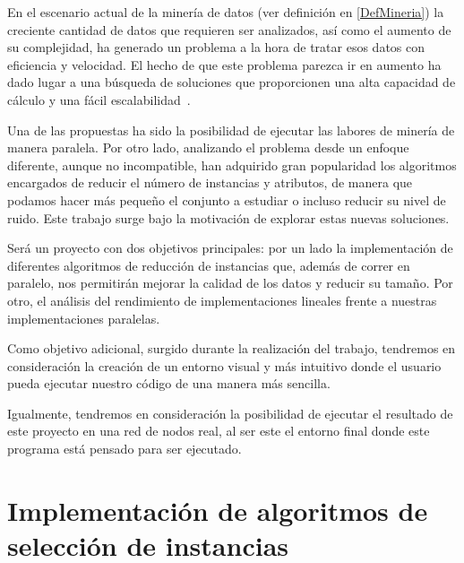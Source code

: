 

En el escenario actual de la minería de datos (ver definición en \ref{DefMineria}) la creciente cantidad de datos que requieren ser analizados, así como el aumento de su complejidad,  ha generado un problema a la hora de tratar esos datos con eficiencia y velocidad. El hecho de que este problema parezca ir en aumento ha dado lugar a una búsqueda de soluciones que proporcionen una alta capacidad de cálculo y una fácil escalabilidad~\cite{DataMiningConcepts}. 

Una de las propuestas ha sido la posibilidad de ejecutar las labores de minería de manera paralela. Por otro lado, analizando el problema desde un enfoque diferente, aunque no incompatible, han adquirido gran popularidad los algoritmos encargados de reducir el número de instancias y atributos, de manera que podamos hacer más pequeño el conjunto a estudiar o incluso reducir su nivel de ruido. Este trabajo surge bajo la motivación de explorar estas nuevas soluciones. 

Será un proyecto con dos objetivos principales: por un lado la implementación de diferentes algoritmos de reducción de instancias que, además de correr en paralelo, nos permitirán mejorar la calidad de los datos y reducir su tamaño. Por otro, el análisis del rendimiento de implementaciones lineales frente a nuestras implementaciones paralelas.

Como objetivo adicional, surgido durante la realización del trabajo, tendremos en consideración la creación de un entorno visual y más intuitivo donde el usuario pueda ejecutar nuestro código de una manera más sencilla.

Igualmente, tendremos en consideración la posibilidad de ejecutar el resultado de este proyecto en una red de nodos real, al ser este el entorno final donde este programa está pensado para ser ejecutado.

\section{Implementación de algoritmos de selección de instancias}

